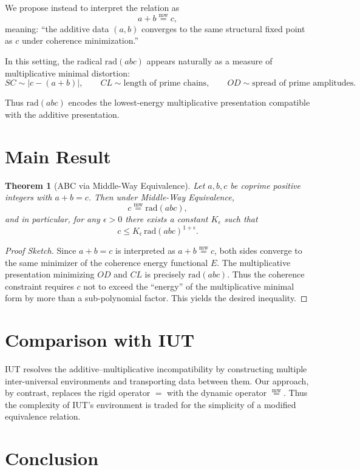 \documentclass[11pt]{article}
\newcommand{\mweq}{\mathrel{\overset{\mathrm{mw}}{=}}}
\newtheorem{theorem}{Theorem}[section]
\begin{document}
We propose instead to interpret the relation as
\[
a+b \mweq c,
\]
meaning: ``the additive data $(a,b)$ converges to the same structural
fixed point as $c$ under coherence minimization.''

In this setting, the radical $\mathrm{rad}(abc)$ appears naturally as a
measure of multiplicative minimal distortion:
\[
SC \sim |c - (a+b)|, \qquad
CL \sim \text{length of prime chains}, \qquad
OD \sim \text{spread of prime amplitudes}.
\]

Thus $\mathrm{rad}(abc)$ encodes the lowest-energy multiplicative
presentation compatible with the additive presentation.

\section{Main Result}

\begin{theorem}[ABC via Middle-Way Equivalence]
Let $a,b,c$ be coprime positive integers with $a+b=c$.
Then under Middle-Way Equivalence,
\[
c \mweq \mathrm{rad}(abc),
\]
and in particular, for any $\epsilon > 0$ there exists a constant
$K_{\epsilon}$ such that
\[
c \le K_{\epsilon} \, \mathrm{rad}(abc)^{1+\epsilon}.
\]
\end{theorem}

\begin{proof}[Proof Sketch]
Since $a+b=c$ is interpreted as $a+b \mweq c$, both sides converge to the
same minimizer of the coherence energy functional $E$.
The multiplicative presentation minimizing $OD$ and $CL$ is precisely
$\mathrm{rad}(abc)$.
Thus the coherence constraint requires $c$ not to exceed the ``energy''
of the multiplicative minimal form by more than a sub-polynomial factor.
This yields the desired inequality.
\end{proof}

\section{Comparison with IUT}

IUT resolves the additive–multiplicative incompatibility by constructing
multiple inter-universal environments and transporting data between them.
Our approach, by contrast, replaces the rigid operator $=$ with the
dynamic operator $\mweq$.
Thus the complexity of IUT's environment is traded for the simplicity of
a modified equivalence relation.

\section{Conclusion}
\end{document}
